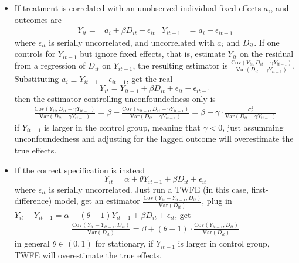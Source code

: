 \documentclass[twoside]{article}
\begin{document}
\begin{itemize}
    \item If treatment is correlated with an unobserved individual fixed effects $a_i$, and outcomes are 
    \begin{align*}
        Y_{it} =& a_i+\beta D_{it}+\epsilon_{it} & Y_{it-1} &=a_i + \epsilon_{it-1}
    \end{align*}
    where $\epsilon_{it}$ is serially uncorrelated, and uncorrelated with $a_i$ and $D_{it}$. If one controls for $Y_{it-1}$ but ignore fixed effects, that is, estimate $Y_{it}$ on the residual from a regression of $D_{it}$ on $Y_{it-1}$, the resulting estimator is $\frac{\mathrm{Cov}\left(Y_{it},D_{it}-\gamma Y_{it-1}\right)}{\mathrm{Var}\left(D_{it}-\gamma Y_{it-1}\right)}$.
    Substituting $a_i\equiv Y_{it-1}-\epsilon_{it-1}$, get the real $$ Y_{it} = Y_{it-1} + \beta D_{it}+\epsilon_{it}-\epsilon_{it-1} $$
    then the estimator controlling unconfoundedness only is 
    \begin{align*}
        \frac{\mathrm{Cov}\left(Y_{it},D_{it}-\gamma Y_{it-1}\right)}{\mathrm{Var}\left(D_{it}-\gamma Y_{it-1}\right)} = \beta - \frac{\mathrm{Cov}\left( \epsilon_{it-1},D_{it}-\gamma Y_{it-1} \right)}{\mathrm{Var}\left(D_{it}-\gamma Y_{it-1}\right)} = \beta + \gamma\cdot \frac{\sigma^2_{\epsilon}}{\mathrm{Var}\left(D_{it}-\gamma Y_{it-1}\right)}
    \end{align*}
    if $ Y_{it-1} $ is larger in the control group, meaning that $\gamma<0$, just assumming unconfoundedness and adjusting for the lagged outcome will overestimate the true effects.
    \item If the correct specification is instead $$ Y_{it}=\alpha + \theta Y_{it-1}+\beta D_{it}+\epsilon_{it} $$
    where $\epsilon_{it}$ is serially uncorrelated. Just run a TWFE (in this case, first-difference) model, get an estimator $ \frac{\mathrm{Cov}\left(Y_{it}-Y_{it-1},D_{it}\right)}{\mathrm{Var}\left(D_{it}\right)} $, plug in $Y_{it}-Y_{it-1}=\alpha + \left(\theta-1\right)Y_{it-1}+\beta D_{it}+\epsilon_{it}$, get 
    \begin{align*}
        \frac{\mathrm{Cov}\left(Y_{it}-Y_{it-1},D_{it}\right)}{\mathrm{Var}\left(D_{it}\right)} = \beta + \left(\theta-1\right)\cdot \frac{\mathrm{Cov}\left(Y_{it-1},D_{it}\right)}{\mathrm{Var}\left(D_{it}\right)}
    \end{align*}
    in general $\theta\in \left(0,1\right)$ for stationary, if $Y_{it-1}$ is larger in control group, TWFE will overestimate the true effects.
\end{itemize}
\end{document}
